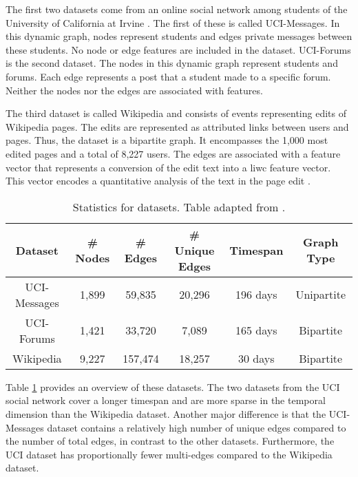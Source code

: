 The first two datasets come from an online social network among students of the University of California at Irvine \cite{kunegis_konect_2013}. The first of these is called UCI-Messages. In this dynamic graph, nodes represent students and edges private messages between these students. No node or edge features are included in the dataset. UCI-Forums is the second dataset. The nodes in this dynamic graph represent students and forums. Each edge represents a post that a student made to a specific forum. Neither the nodes nor the edges are associated with features.

The third dataset is called Wikipedia \cite{kumar_predicting_2019} and consists of events representing edits of Wikipedia pages. The edits are represented as attributed links between users and pages. Thus, the dataset is a bipartite graph. It encompasses the 1,000 most edited pages and a total of 8,227 users. The edges are associated with a feature vector that represents a conversion of the edit text into a \gls{liwc} \cite{pennebaker_linguistic_2001} feature vector. This vector encodes a quantitative analysis of the text in the page edit \cite{pennebaker_linguistic_2001}.

\begin{table}[ht]
    \centering
    \begin{tabular}{cccccc}
        \hline
         Dataset&  \# Nodes&  \# Edges&  \# Unique Edges& Timespan & Graph Type\\
         \hline
         UCI-Messages \cite{kunegis_konect_2013} & 1,899 & 59,835 & 20,296 &196 days & Unipartite\\
        UCI-Forums \cite{kunegis_konect_2013}& 1,421& 33,720& 7,089&165 days& Bipartite\\
        Wikipedia \cite{kumar_predicting_2019}& 9,227& 157,474& 18,257&30 days& Bipartite\\
        \hline
    \end{tabular}
    \caption{Statistics for datasets. Table adapted from \cite{poursafaei_towards_2022}.}
    \label{t_Datasets}
\end{table}

Table \ref{t_Datasets} provides an overview of these datasets. The two datasets from the UCI social network cover a longer timespan and are more sparse in the temporal dimension than the Wikipedia dataset. Another major difference is that the UCI-Messages dataset contains a relatively high number of unique edges compared to the number of total edges, in contrast to the other datasets. 
Furthermore, the UCI dataset has proportionally fewer multi-edges compared to the Wikipedia dataset.



